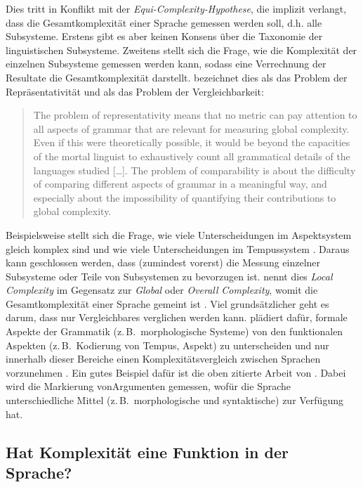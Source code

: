 Dies tritt in Konflikt mit der \textit{Equi-Com\-ple\-xi\-ty-Hy\-po\-the\-se}, die implizit verlangt, dass die Gesamtkomplexität einer Sprache gemessen werden soll, d.h. alle Subsysteme. Erstens gibt es aber keinen Konsens über die Taxonomie der linguistischen Subsysteme. Zweitens stellt sich die Frage, wie die Komplexität der einzelnen Subsysteme gemessen werden kann, sodass eine Verrechnung der Resultate die Gesamtkomplexität darstellt. \citet{Miestamo2008} bezeichnet dies als das Problem der Repräsentativität und als das Problem der Vergleichbarkeit:

\begin{quote}
The problem of representativity means that no metric can pay attention to all aspects of grammar that are relevant for measuring global complexity. Even if this were theoretically possible, it would be beyond the capacities of the mortal linguist to exhaustively count all grammatical details of the languages studied […]. The problem of comparability is about the difficulty of comparing different aspects of grammar in a meaningful way, and especially about the impossibility of quantifying their contributions to global complexity. \citep[30]{Miestamo2008}
\end{quote}

\noindent\largerpage
Beispielsweise stellt sich die Frage, wie viele Unterscheidungen im Aspektsystem gleich komplex sind und wie viele Unterscheidungen im Tempussystem \citep[7]{Miestamo2006}. Daraus kann geschlossen werden, dass (zumindest vorerst) die Messung einzelner Subsysteme oder Teile von Subsystemen zu bevorzugen ist. \citet{Miestamo2008} nennt dies \textit{Local Complexity} im Gegensatz zur \textit{Global} oder \textit{Overall} \textit{Complexity}, womit die Gesamtkomplexität einer Sprache gemeint ist \citep[29]{Miestamo2008}. Viel grundsätzlicher geht es darum, dass nur Vergleichbares verglichen werden kann. \citet{Miestamo2008} plädiert dafür, formale Aspekte der Grammatik (z.\,B.\ morphologische Systeme) von den funktionalen Aspekten (z.\,B.\ Kodierung von Tempus, Aspekt) zu unterscheiden und nur innerhalb dieser Bereiche einen Komplexitätsvergleich zwischen Sprachen vorzunehmen \citep[31]{Miestamo2008}. Ein gutes Beispiel dafür ist die oben zitierte Arbeit von \citet{Sinnemäki2008}. Dabei wird die Markierung von\largerpage Argumenten gemessen, wofür die Sprache unterschiedliche Mittel (z.\,B.\ morphologische und syntaktische) zur Verfügung hat.

\subsection{Hat Komplexität eine Funktion in der Sprache?}\label{2.1.3}


